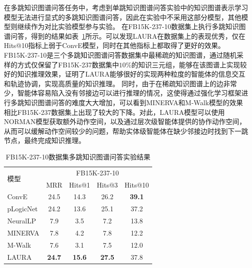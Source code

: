 \documentclass[algorithmlist, AutoFakeBold, AutoFakeSlant, figurelist, tablelist, nomlist, masters]{seuthesix}
\begin{document}
在多跳知识图谱问答任务中，考虑到单跳知识图谱问答实验中的知识图谱表示学习模型无法进行显式的多跳知识图谱问答，因此在实验中不采用这部分模型，其他模型则继续作为对比实验模型参与实验。
在FB15K-237-10数据集上执行多跳知识图谱问答，得到的结果如表~\ref{Experiment2_FB15K-237-10}所示。可以发现LAURA在数据集上的表现优秀，仅在Hits@10指标上弱于ConvE模型，同时在其他指标上都取得了更好的效果。FB15K-237-10是三个多跳知识图谱问答数据集中最稀疏的知识图谱，通过随机采样的方式仅保留了FB15K-237数据集中$10\%$的知识三元组，能够在该图谱上实现较好的知识推理效果，证明了LAURA能够很好的实现两种粒度的智能体的信息交互和轨迹协调，实现高质量的知识推理。
同时，由于在稀疏知识图谱上的边非常少，智能体容易陷入没有邻接边可以进行推理的情况，这使得通过强化学习框架进行多跳知识图谱问答的难度大大增加，可以看到MINERVA和M-Walk模型的效果相比FB15K-237数据集上出现了较大的下降。对此，LAURA模型可以使用NORMAN模型获取额外动作空间，以及通过层次级智能体提供的协作动作空间，从而可以缓解动作空间较少的问题，帮助实体级智能体在缺少邻接边时找到下一跳节点，最终完成知识推理。
\begin{table}[]
  \centering
  \begin{tabular*}{0.95\textwidth}{@{\extracolsep{\fill}}lcccc}
  \toprule[1pt]
  \multirow{2}{*}{模型} & \multicolumn{4}{c}{FB15K-237-10}   \\
    & MRR & Hits@1 & Hits@3 & Hits@10 \\ \hline
  ConvE & 24.5 & 14.3 & 26.2 & \textbf{39.1} \\
  pLogicNet & 24.2 & 13.6 & 25.1 & 37.2 \\
  NeuralLP & 7.9 & 3.5 & 7.2 & 13.8 \\
  MINERVA & 7.8 & 4.2 & 7.8 & 12.2 \\
  M-Walk & 7.6 & 3.1 & 7.5 & 12.0 \\
  LAURA & \textbf{24.7} & \textbf{15.6} & \textbf{27.5} & 37.8 \\
  \bottomrule[1pt]
  \end{tabular*}
  \caption{FB15K-237-10数据集多跳知识图谱问答实验结果}
  \label{Experiment2_FB15K-237-10}
\end{table}
\end{document}

